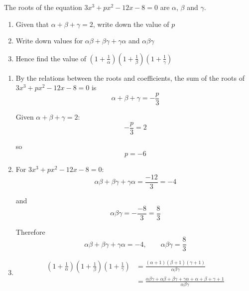 \documentclass[leqno]{article}
\begin{document}
\djsFrontMatter
\begin{enumerate}[
  label=\textbf{\arabic*.},
  leftmargin=*,
  topsep=0pt,
  partopsep=0pt,
  parsep=0pt
]

\questionitem

The roots of the equation $3x^3 + px^2 - 12x - 8 = 0$ are $\alpha$, $\beta$ and $\gamma$. \\

\begin{enumerate}[label=\textbf{(\alph*)}]
  \item Given that $\alpha + \beta + \gamma = 2$, write down the value of $p$  \\
  \item Write down values for $\alpha\beta + \beta\gamma + \gamma\alpha$ and $\alpha\beta\gamma$  \\
  \item Hence find the value of $\left(1+\frac{1}{\alpha}\right)\left(1+\frac{1}{\beta}\right)\left(1+\frac{1}{\gamma}\right)$  \\
\end{enumerate}

\vspace*{10pt}

\begin{djsSolution}
\begin{enumerate}[label=\textbf{(\alph*)}]
  \item By the relations between the roots and coefficients, the sum of the roots of \(3x^3+px^2-12x-8=0\) is
  \[
  \alpha+\beta+\gamma=-\frac{p}{3}
  \]

  Given \(\alpha+\beta+\gamma=2\):
  \[
  -\frac{p}{3}=2
  \]

  so
  \[
  p=-6
  \]

  \item For \(3x^3+px^2-12x-8=0\):
  \[
  \alpha\beta+\beta\gamma+\gamma\alpha=\frac{-12}{3}=-4
  \]

  and
  \[
  \alpha\beta\gamma=-\frac{-8}{3}=\frac{8}{3}
  \]

  Therefore
  \[
  \alpha\beta+\beta\gamma+\gamma\alpha=-4,\qquad \alpha\beta\gamma=\frac{8}{3}
  \]

  \item
  \begin{align*}
  \left(1+\frac{1}{\alpha}\right)\left(1+\frac{1}{\beta}\right)\left(1+\frac{1}{\gamma}\right)
  &=\frac{(\alpha+1)(\beta+1)(\gamma+1)}{\alpha\beta\gamma} \\
  &=\frac{\alpha\beta\gamma+\alpha\beta+\beta\gamma+\gamma\alpha+\alpha+\beta+\gamma+1}{\alpha\beta\gamma}
  \end{align*}


\end{enumerate}
\end{djsSolution}
\end{enumerate}
\end{document}
